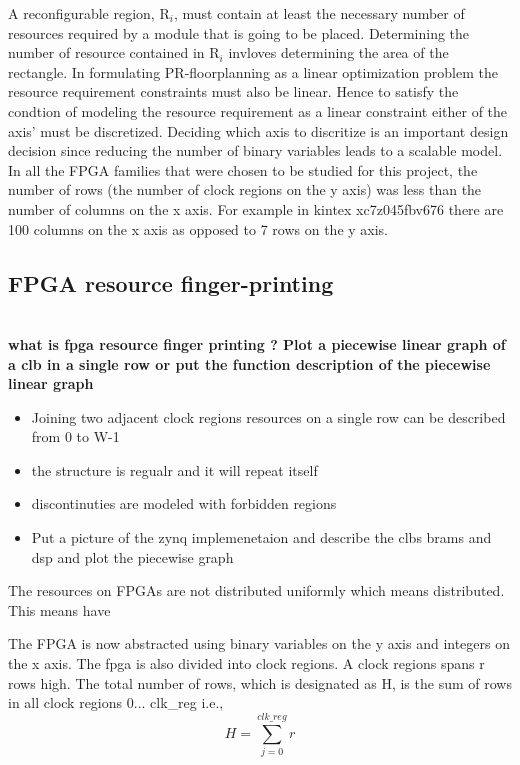 A reconfigurable region, R$_i$, must contain at least the necessary number of resources required by a module that is going to be placed. Determining the number of resource contained in R$_i$ invloves determining the area of the rectangle. In formulating PR-floorplanning as a linear optimization problem the resource requirement constraints must also be linear. Hence to satisfy the condtion of modeling the resource requirement as a linear constraint either of the axis' must be discretized. Deciding which axis to discritize is an important design decision since reducing the number of binary variables leads to a scalable model. In all the FPGA families that were chosen to be studied for this project, the number of rows (the number of clock regions on the y axis) was less than the number of columns on the x axis. For example in kintex xc7z045fbv676 there are 100 columns on the x axis as opposed to 7 rows on the y axis.\\


\subsection{FPGA resource finger-printing} 
\textbf{\\what is fpga resource finger printing ? Plot a piecewise linear graph of a clb in a single row or put the function description of the piecewise linear graph} \\

\begin{itemize}
\item Joining two adjacent clock regions resources on a single row can be described from 0 to W-1
\item the structure is regualr and it will repeat itself 
\item discontinuties are modeled with forbidden regions
\item Put a picture of the zynq implemenetaion and describe the clbs brams and dsp and plot the piecewise graph
\end{itemize}



The resources on FPGAs are not distributed uniformly which means  distributed. This means have 

The FPGA is now abstracted using binary variables on the y axis and integers on the x axis. The fpga is also divided into clock regions. A clock regions spans r rows high. The total number of rows, which is designated as H, is the sum of rows in all clock regions {0... clk\_reg} i.e.,  
\begin{equation}
H = \sum_{j=0}^{clk\_reg} r
\end{equation}

